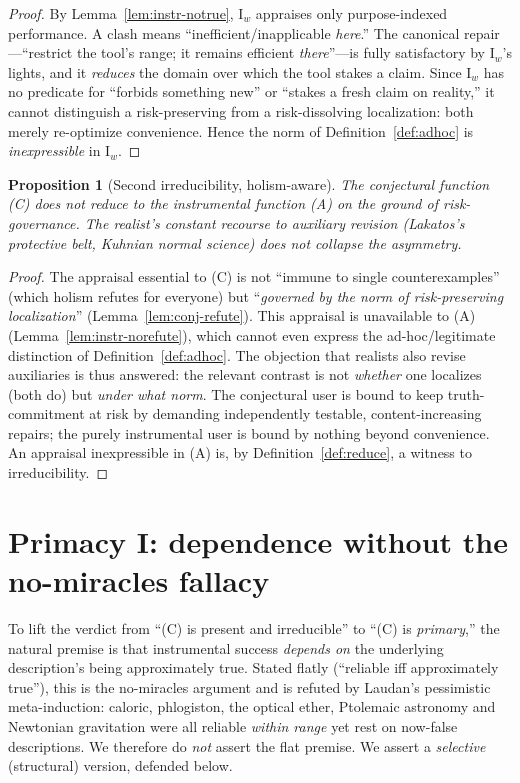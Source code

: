 \documentclass{amsart}
\theoremstyle{definition}
\theoremstyle{plain}
\newtheorem{proposition}{Proposition}
\begin{document}
\begin{proof}
By Lemma~\ref{lem:instr-notrue}, $\mathrm I_w$ appraises only purpose-indexed
performance. A clash means ``inefficient/inapplicable \emph{here}.'' The
canonical repair---``restrict the tool's range; it remains efficient
\emph{there}''---is fully satisfactory by $\mathrm I_w$'s lights, and it
\emph{reduces} the domain over which the tool stakes a claim. Since $\mathrm
I_w$ has no predicate for ``forbids something new'' or ``stakes a fresh claim on
reality,'' it cannot distinguish a risk-preserving from a risk-dissolving
localization: both merely re-optimize convenience. Hence the norm of
Definition~\ref{def:adhoc} is \emph{inexpressible} in $\mathrm I_w$.
\end{proof}

\begin{proposition}[Second irreducibility, holism-aware]\label{prop:irred2}
The conjectural function \textup{(C)} does not reduce to the instrumental
function \textup{(A)} on the ground of risk-governance. The realist's constant
recourse to auxiliary revision (Lakatos's protective belt, Kuhnian normal
science) does \emph{not} collapse the asymmetry.
\end{proposition}

\begin{proof}
The appraisal essential to (C) is not ``immune to single counterexamples''
(which holism refutes for everyone) but ``\emph{governed by the norm of
risk-preserving localization}'' (Lemma~\ref{lem:conj-refute}). This appraisal
is unavailable to (A) (Lemma~\ref{lem:instr-norefute}), which cannot even
express the ad-hoc/legitimate distinction of Definition~\ref{def:adhoc}.
The objection that realists also revise auxiliaries is thus answered: the
relevant contrast is not \emph{whether} one localizes (both do) but \emph{under
what norm}. The conjectural user is bound to keep truth-commitment at risk by
demanding independently testable, content-increasing repairs; the purely
instrumental user is bound by nothing beyond convenience. An appraisal
inexpressible in (A) is, by Definition~\ref{def:reduce}, a witness to
irreducibility.
\end{proof}

\section{Primacy I: dependence without the no-miracles fallacy}

To lift the verdict from ``(C) is present and irreducible'' to ``(C) is
\emph{primary},'' the natural premise is that instrumental success
\emph{depends on} the underlying description's being approximately true. Stated
flatly (``reliable iff approximately true''), this is the no-miracles argument
and is refuted by Laudan's pessimistic meta-induction: caloric, phlogiston, the
optical ether, Ptolemaic astronomy and Newtonian gravitation were all reliable
\emph{within range} yet rest on now-false descriptions. We therefore do
\emph{not} assert the flat premise. We assert a \emph{selective} (structural)
version, defended below.
\end{document}
